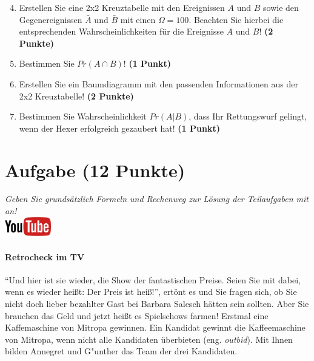 \documentclass[a4paper, 9pt]{scrartcl}\usepackage[]{graphicx}\usepackage[]{xcolor}
\begin{document}
\begin{enumerate}
  \setcounter{enumi}{3}
\item Erstellen Sie eine 2x2 Kreuztabelle mit den Ereignissen $A$ und $B$
  sowie den Gegenereignissen $\bar{A}$ und $\bar{B}$ mit einen
  $\Omega = 100$. Beachten Sie hierbei die entsprechenden
  Wahrscheinlichkeiten f{\"u}r die Ereignisse $A$ und $B$! \textbf{(2 Punkte)}
\item Bestimmen Sie $Pr(A \cap B)$! \textbf{(1 Punkt)}
\item Erstellen Sie ein Baumdiagramm mit den passenden Informationen aus der 2x2
  Kreuztabelle! \textbf{(2 Punkte)}
\item Bestimmen Sie Wahrscheinlichkeit $Pr(A|B)$, dass Ihr Rettungswurf gelingt, wenn
  der Hexer erfolgreich gezaubert hat! \textbf{(1 Punkt)}
\end{enumerate}

  
\clearpage

\section{Aufgabe \hfill (12 Punkte)}

\textit{Geben Sie grunds{\"a}tzlich Formeln und Rechenweg zur L{\"o}sung der
  Teilaufgaben mit an!} \\[1Ex]

\hfill\href{https://youtu.be/9DQKaXdxT_g}{\includegraphics[width =
  2cm]{img/youtube}} %
\hspace{2Ex}

\paragraph{Retrocheck im TV}



"`Und hier ist sie wieder, die Show der fantastischen Preise. Seien Sie mit
dabei, wenn es wieder hei{\ss}t: Der Preis ist hei{\ss}!"', ert{\"o}nt es und Sie
fragen sich, ob Sie nicht doch lieber bezahlter Gast bei Barbara Salesch
h{\"a}tten sein sollten. Aber Sie brauchen das Geld und jetzt hei{\ss}t es
Spielschows farmen! Erstmal eine Kaffemaschine von Mitropa
gewinnen. Ein Kandidat gewinnt die Kaffeemaschine von Mitropa, wenn nicht alle
Kandidaten {\"u}berbieten (eng. \textit{outbid}). Mit Ihnen bilden
Annegret und G{"u}nther das Team der drei Kandidaten.
\end{document}
